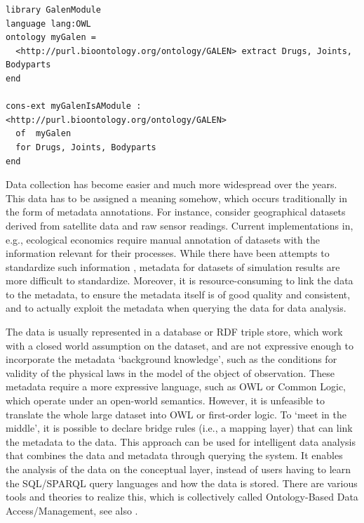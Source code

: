 \documentclass[10pt, a4paper]{isov2}
\newcommand*{\termref}[1]{\index{#1}#1\xspace}
\begin{document}
\begin{lstlisting}[basicstyle=\ttfamily,language=dolText,escapechar=@,mathescape]
%prefix( lang:  <http://purl.net/DOL/languages/> )%
library GalenModule
language lang:OWL
ontology myGalen = 
  <http://purl.bioontology.org/ontology/GALEN> extract Drugs, Joints, Bodyparts
end

cons-ext myGalenIsAModule : <http://purl.bioontology.org/ontology/GALEN>
  of  myGalen 
  for Drugs, Joints, Bodyparts
end
\end{lstlisting}
 

Data collection has become easier and much more widespread over the years. This data has to be 
assigned a meaning somehow, which occurs traditionally in the  form of metadata annotations. For 
instance, consider geographical datasets derived from satellite data and raw sensor readings. 
Current implementations in, e.g., ecological economics \cite{bagstad_aries_2011} require manual 
annotation of datasets with the information relevant for their processes. While there have been 
attempts to standardize such information \cite{european_comission_inspire_2014}, metadata for 
datasets of simulation results are more difficult to standardize. Moreover, it is 
resource-consuming to link the data to the metadata, to ensure the metadata itself is of good 
quality and consistent, and to actually exploit the metadata when querying the data for data 
analysis. 

The data is usually represented in a database or RDF triple store, which work with a \termref{closed world assumption} on the dataset, and are not expressive enough to 
incorporate the metadata `background knowledge', such as the conditions for validity of the physical laws in the model of the object of observation. These metadata 
require a more expressive language, such as OWL or Common Logic, which operate under an open-world semantics. However, it is unfeasible to translate the 
whole large dataset into OWL or first-order logic. To `meet in the middle', it is possible to declare bridge rules (i.e., a mapping layer) that can link the metadata to 
the data. This approach can be used for intelligent data analysis that combines the data and metadata through querying the system. It enables the analysis of the 
data on the conceptual layer, instead of users having to learn the SQL/SPARQL query languages and how the data is stored. There are various tools and theories 
to realize this, which is collectively called Ontology-Based Data Access/Management, see also \cite{CalvaneseEtAl11}.
\end{document}

